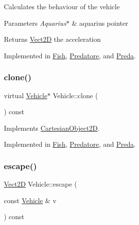 Calculates the behaviour of the vehicle 
\begin{DoxyParams}{Parameters}
{\em Aquarius$\ast$} & aquarius pointer \\
\hline
\end{DoxyParams}
\begin{DoxyReturn}{Returns}
\hyperlink{classVect2D}{Vect2D} the acceleration 
\end{DoxyReturn}


Implemented in \hyperlink{classFish_abffd423bc7a7730aafa80ec9c0cec9a0_abffd423bc7a7730aafa80ec9c0cec9a0}{Fish}, \hyperlink{classPredatore_adc1dc0f0cdd41923d87dc23b4fc550a7_adc1dc0f0cdd41923d87dc23b4fc550a7}{Predatore}, and \hyperlink{classPreda_a5c0724c3854a2fff92f3c2308514c89e_a5c0724c3854a2fff92f3c2308514c89e}{Preda}.

\mbox{\label{classVehicle_a6c8513134608499d188a2e994accdb7c_a6c8513134608499d188a2e994accdb7c}} 
\subsubsection{\texorpdfstring{clone()}{clone()}}
{\footnotesize\ttfamily virtual \hyperlink{classVehicle}{Vehicle}$\ast$ Vehicle\+::clone (\begin{DoxyParamCaption}{ }\end{DoxyParamCaption}) const\hspace{0.3cm}{\ttfamily [pure virtual]}}



Implements \hyperlink{classCartesianObject2D_afd883b92328b20defd9ed7af581206ab_afd883b92328b20defd9ed7af581206ab}{Cartesian\+Object2D}.



Implemented in \hyperlink{classFish_a6732945f7373a28b1723e55de8a65e13_a6732945f7373a28b1723e55de8a65e13}{Fish}, \hyperlink{classPredatore_a493b41e7df1542c10cdd646559514917_a493b41e7df1542c10cdd646559514917}{Predatore}, and \hyperlink{classPreda_a12baf94e52873bf3b9a9a9da84c357c5_a12baf94e52873bf3b9a9a9da84c357c5}{Preda}.

\mbox{\label{classVehicle_ae5fbf395cbebf51498cbe8b2baaddc16_ae5fbf395cbebf51498cbe8b2baaddc16}} 
\subsubsection{\texorpdfstring{escape()}{escape()}}
{\footnotesize\ttfamily \hyperlink{classVect2D}{Vect2D} Vehicle\+::escape (\begin{DoxyParamCaption}\item[{const \hyperlink{classVehicle}{Vehicle} \&}]{v }\end{DoxyParamCaption}) const}

